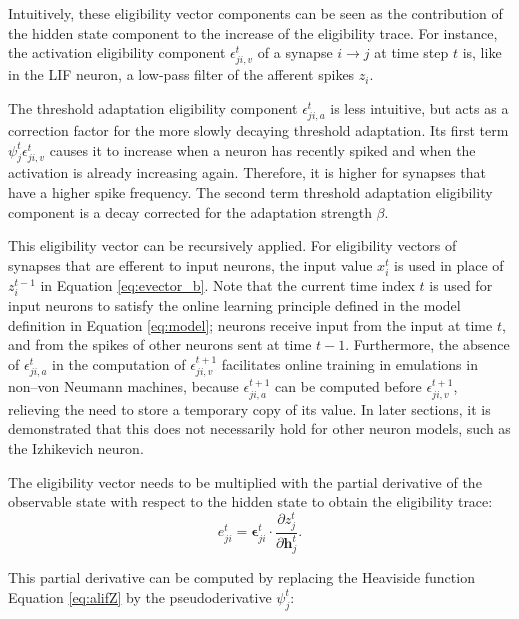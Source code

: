             Intuitively, these eligibility vector components can be seen as the contribution of the hidden state component to the increase of the eligibility trace.
            For instance, the activation eligibility component $\epsilon^t_{ji,v}$ of a synapse $i\rightarrow j$ at time step $t$ is, like in the LIF neuron, a low-pass filter of the afferent spikes $z_i$.

            The threshold adaptation eligibility component $\epsilon^t_{ji,a}$ is less intuitive, but acts as a correction factor for the more slowly decaying threshold adaptation.
            Its first term $\psi^t_j\epsilon^t_{ji,v}$ causes it to increase when a neuron has recently spiked and when the activation is already increasing again.
            Therefore, it is higher for synapses that have a higher spike frequency.
            The second term threshold adaptation eligibility component is a decay corrected for the adaptation strength $\beta$.

            This eligibility vector can be recursively applied.
            For eligibility vectors of synapses that are efferent to input neurons, the input value $x^t_i$ is used in place of $z_i^{t-1}$ in Equation \ref{eq:evector_b}.
            Note that the current time index $t$ is used for input neurons to satisfy the online learning principle defined in the model definition in Equation \ref{eq:model}; neurons receive input from the input at time $t$, and from the spikes of other neurons sent at time $t-1$.
            Furthermore, the absence of $\epsilon_{ji, a}^t$ in the computation of $\epsilon_{ji, v}^{t+1}$ facilitates online training in emulations in non--von Neumann machines, because $\epsilon_{ji, a}^{t+1}$ can be computed before $\epsilon_{ji, v}^{t+1}$, relieving the need to store a temporary copy of its value.
            In later sections, it is demonstrated that this does not necessarily hold for other neuron models, such as the Izhikevich neuron.

            The eligibility vector needs to be multiplied with the partial derivative of the observable state with respect to the hidden state to obtain the eligibility trace:
            \begin{equation}
            e^t_{ji} = \bm{\epsilon}_{ji}^t \cdot \frac{\partial z^t_j}{\partial\mathbf{h}^t_j}.
            \end{equation}

            This partial derivative can be computed by replacing the Heaviside function Equation \ref{eq:alifZ} by the pseudoderivative $\psi^t_j$:

